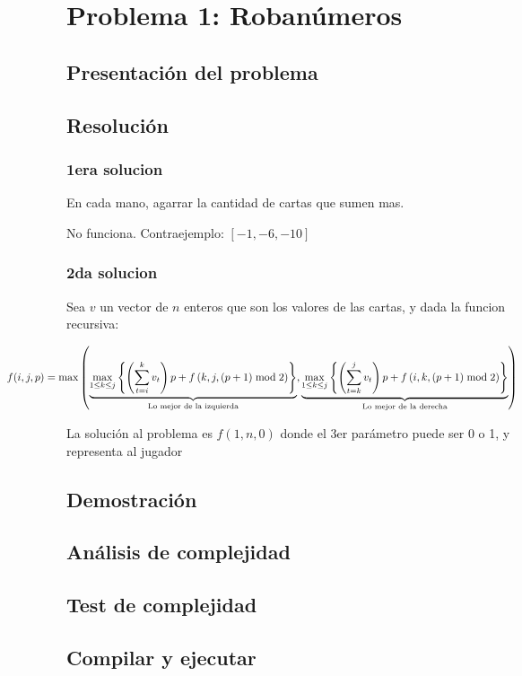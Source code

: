 \section{Problema 1: Roban\'umeros}

\subsection{Presentaci\'on del problema}

\subsection{Resoluci\'on}

\subsubsection{1era solucion}
En cada mano, agarrar la cantidad de cartas que sumen mas. 

No funciona. Contraejemplo: $[-1, -6, -10]$
  
\subsubsection{2da solucion}

Sea $v$ un vector de $n$ enteros que son los valores de las cartas, y dada la funcion recursiva: 

\begin{equation*}
 \hspace*{-2cm}
 f(i,j,p) = \max \left( 
  \underbrace{ \max_{1\leq k \leq j}{ \left\{ \left( \sum_{t=i}^k v_t \right) p + f\left(k,j, (p+1)\bmod{2} \right) \right\} } }_{ \text{Lo mejor de la izquierda} },
  \underbrace{ \max_{1\leq k \leq j}{ \left\{ \left( \sum_{t=k}^j v_t \right) p + f\left(i,k, (p+1)\bmod{2} \right) \right\} } }_{ \text{Lo mejor de la derecha} }
 \right) 
\end{equation*}

La soluci\'on al problema es $f(1,n,0)$ donde el 3er par\'ametro puede ser 0 o 1, y representa al jugador


\subsection{Demostraci\'on}

\subsection{An\'alisis de complejidad}

\subsection{Test de complejidad}

\subsection{Compilar y ejecutar}
